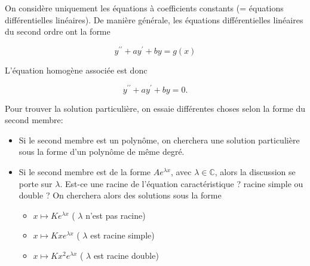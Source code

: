 On considère uniquement les équations à coefficients constants (= équations différentielles linéaires). De manière générale, les équations différentielles linéaires du second ordre ont la forme

$$
y^{\prime \prime}+a y^{\prime}+b y=g(x)
$$

L'équation homogène associée est donc

$$
y^{\prime \prime}+a y^{\prime}+b y=0 .
$$


Pour trouver la solution particulière, on essaie différentes choses selon la forme du second membre:
\begin{itemize}
    \item Si le second membre est un polynôme, on cherchera une solution particulière sous la forme d'un polynôme de même degré.
    \item Si le second membre est de la forme $A e^{\lambda x}$, avec $\lambda \in \mathbb{C}$, alors la discussion se porte sur $\lambda$. Est-ce une racine de l'équation caractéristique ? racine simple ou double ? On cherchera alors des solutions sous la forme 
    \begin{itemize}
        \item $x \mapsto K e^{\lambda x}$ ( $\lambda$ n'est pas racine)
        \item $x \mapsto K x e^{\lambda x}$ ( $\lambda$ est racine simple)
        \item $x \mapsto K x^2 e^{\lambda x}$ ( $\lambda$ est racine double)
    \end{itemize}
\end{itemize}

